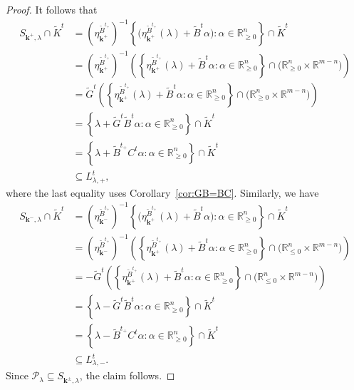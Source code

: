 \documentclass{amsart}
\numberwithin{theorem}{section}
\newcommand{\bfk}{{\boldsymbol{k}}}
\newcommand{\cP}{\mathcal{P}}
\newcommand{\RR}{\mathbb{R}}
\begin{document}
\begin{proof}
    It follows that
    \begin{align*}
      S_{\bfk^+,\lambda}\cap \widetilde K^t
      &= \left(\eta^{\widetilde B^{t_+}}_{\bfk^+}\right)^{-1}\left\{\big(\eta^{\widetilde B^{t_+}}_{\bfk^+}(\lambda)+\widetilde B^t\alpha\big):\alpha\in\RR^n_{\ge0}\right\}\cap \widetilde K^t\\
      &= \left(\eta^{\widetilde B^{t_+}}_{\bfk^+}\right)^{-1}\left(\left\{\eta^{\widetilde B^{t_+}}_{\bfk^+}(\lambda)+\widetilde B^t\alpha:\alpha\in\RR^n_{\ge0}\right\}\cap \big( \RR_{\ge0}^n\times \RR^{m-n}\big)\right)\\
      &= \widetilde G^t \left(\left\{\eta^{\widetilde B^{t_+}}_{\bfk^+}(\lambda)+\widetilde B^t\alpha:\alpha\in\RR^n_{\ge0}\right\}\cap \big( \RR_{\ge0}^n\times \RR^{m-n}\big)\right)\\
      &= \left\{\lambda+\widetilde G^t \widetilde B^t\alpha:\alpha\in\RR^n_{\ge0}\right\}\cap \widetilde K^t\\
      &= \left\{\lambda+\widetilde B^{t_+} C^t \alpha:\alpha\in\RR^n_{\ge0}\right\}\cap \widetilde K^t\\
      &\subseteq L^t_{\lambda,+},
    \end{align*}
    where the last equality uses Corollary~\ref{cor:GB=BC}.
    Similarly, we have
    \begin{align*}
      S_{\bfk^-,\lambda}\cap \widetilde K^t
      &= \left(\eta^{\widetilde B^{t_+}}_{\bfk^-}\right)^{-1}\left\{\big(\eta^{\widetilde B^{t_+}}_{\bfk^+}(\lambda)+\widetilde B^t\alpha\big):\alpha\in\RR^n_{\ge0}\right\}\cap \widetilde K^t\\
      &= \left(\eta^{\widetilde B^{t_+}}_{\bfk^-}\right)^{-1}\left(\left\{\eta^{\widetilde B^{t_+}}_{\bfk^+}(\lambda)+\widetilde B^t\alpha:\alpha\in\RR^n_{\ge0}\right\}\cap \big( \RR_{\le0}^n\times \RR^{m-n}\big)\right)\\
      &= -\widetilde G^t \left(\left\{\eta^{\widetilde B^{t_+}}_{\bfk^+}(\lambda)+\widetilde B^t\alpha:\alpha\in\RR^n_{\ge0}\right\}\cap \big( \RR_{\le0}^n\times \RR^{m-n}\big)\right)\\
      &= \left\{\lambda-\widetilde G^t \widetilde B^t\alpha:\alpha\in\RR^n_{\ge0}\right\}\cap \widetilde K^t\\
      &= \left\{\lambda-\widetilde B^{t_+} C^t \alpha:\alpha\in\RR^n_{\ge0}\right\}\cap \widetilde K^t\\
      &\subseteq L^t_{\lambda,-}.
    \end{align*}
    Since $\cP_\lambda\subseteq S_{\bfk^\pm,\lambda}$, the claim follows.
  \end{proof}
\end{document}
